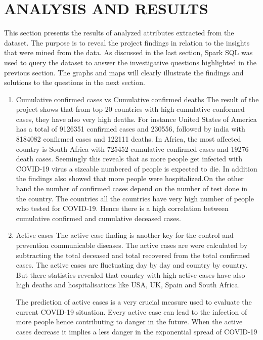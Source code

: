\documentclass[12pt,letterpaper, twoside]{article}
\begin{document}
\section{ANALYSIS AND RESULTS}

This section presents the results of analyzed attributes extracted from the dataset. The purpose is to reveal the project findings  in relation to the insights that were mined from the data. As discussed in the last section, Spark SQL was used to query the dataset to answer the  investigative questions highlighted in the previous section. The graphs and maps will clearly illustrate the findings and solutions to the  questions in the next section.  

\begin{enumerate}
    \item Cumulative confirmed cases vs Cumulative confirmed deaths 
    The result of the project shows that  from top 20 countries with high cumulative conformed cases, they have also very high deaths. For instance United States of America has a total of 9126351 confirmed cases and 230556, followed by india with 8184082 confirmed cases and 122111 deaths. In Africa, the most affected country is South Africa with 725452 cumulative confirmed cases and 19276 death cases. Seemingly this reveals that as more people get infected with COVID-19 virus a sizeable numbered of people is expected to die. In addition the findings also showed that more people were hospitalized.On the other hand the number of confirmed cases depend on the number of test done in the country. The countries all the countries have very high number of people who tested for COVID-19.  Hence there is a high correlation between cumulative confirmed and  cumulative deceased cases. 
    
    \item Active cases
    The active case finding is another key for the control and prevention communicable diseases. The active cases are were calculated by subtracting the total deceased and total recovered from the total confirmed cases. The active cases are fluctuating day by day and country by country.  But  there statistics revealed that country with high active cases have also high deaths and hospitalisations like USA, UK, Spain and South Africa.
    
    The prediction of active cases is a very crucial measure used to evaluate the current COVID-19 situation. Every active case can lead to the infection of more people hence contributing to danger in the future. When the active cases decrease it implies a less danger in the  exponential spread of COVID-19
    

\end{enumerate}
\end{document}
